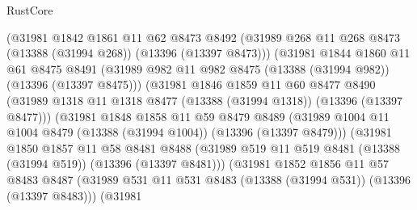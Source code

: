 \begin{lexlean}{RustCore}
\begin{coremodule}
                  (@31981
                    @1842
                    @1861
                    @11
                    @62
                    @8473
                    @8492
                    (@31989 @268 @11 @268 @8473 (@13388 (@31994 @268)) (@13396 (@13397 @8473)))
                    (@31981
                      @1844
                      @1860
                      @11
                      @61
                      @8475
                      @8491
                      (@31989 @982 @11 @982 @8475 (@13388 (@31994 @982)) (@13396 (@13397 @8475)))
                      (@31981
                        @1846
                        @1859
                        @11
                        @60
                        @8477
                        @8490
                        (@31989
                          @1318
                          @11
                          @1318
                          @8477
                          (@13388 (@31994 @1318))
                          (@13396 (@13397 @8477)))
                        (@31981
                          @1848
                          @1858
                          @11
                          @59
                          @8479
                          @8489
                          (@31989
                            @1004
                            @11
                            @1004
                            @8479
                            (@13388 (@31994 @1004))
                            (@13396 (@13397 @8479)))
                          (@31981
                            @1850
                            @1857
                            @11
                            @58
                            @8481
                            @8488
                            (@31989
                              @519
                              @11
                              @519
                              @8481
                              (@13388 (@31994 @519))
                              (@13396 (@13397 @8481)))
                            (@31981
                              @1852
                              @1856
                              @11
                              @57
                              @8483
                              @8487
                              (@31989
                                @531
                                @11
                                @531
                                @8483
                                (@13388 (@31994 @531))
                                (@13396 (@13397 @8483)))
                              (@31981

\end{coremodule}
\end{lexlean}

